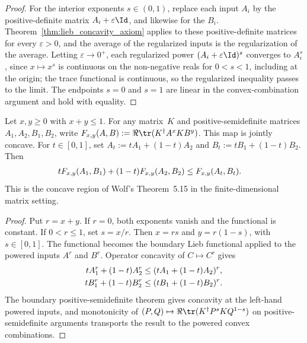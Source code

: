 \begin{proof}\leanok
    For the interior exponents $s\in(0,1)$, replace each input $A_i$ by the
    positive-definite matrix $A_i+\varepsilon\Id$, and likewise for the $B_i$.
    Theorem~\ref{thm:lieb_concavity_axiom} applies to these positive-definite
    matrices for every $\varepsilon>0$, and the average of the regularized
    inputs is the regularization of the average. Letting $\varepsilon\to0^+$,
    each regularized power $(A_i+\varepsilon\Id)^s$ converges to $A_i^s$, since
    $x\mapsto x^s$ is continuous on the non-negative reals for $0<s<1$, including
    at the origin; the trace functional is continuous, so the regularized
    inequality passes to the limit. The endpoints $s=0$ and $s=1$ are linear in
    the convex-combination argument and hold with equality.
\end{proof}

\begin{theorem}
    \label{thm:lieb_concavity_subboundary}
    \leanok
    Let $x,y\ge0$ with $x+y\le1$. For any matrix~$K$ and
    positive-semidefinite matrices $A_1,A_2,B_1,B_2$, write
    $F_{x,y}(A,B):=\Re\tr(K^\dagger A^x K B^y)$. This map is jointly concave.
    For $t\in[0,1]$, set $A_t:=tA_1+(1-t)A_2$ and
    $B_t:=tB_1+(1-t)B_2$. Then
    \begin{align}
        tF_{x,y}(A_1,B_1)+(1-t)F_{x,y}(A_2,B_2)
        &\le F_{x,y}(A_t,B_t).
        \notag
    \end{align}
    This is the concave region of Wolf's Theorem~5.15 in the
    finite-dimensional matrix setting.
\end{theorem}

\begin{proof}\leanok
    Put $r=x+y$. If $r=0$, both exponents vanish and the functional is constant.
    If $0<r\le1$, set $s=x/r$. Then $x=rs$ and $y=r(1-s)$, with
    $s\in[0,1]$. The functional becomes the boundary Lieb functional applied to
    the powered inputs $A^r$ and $B^r$. Operator concavity of
    $C\mapsto C^r$ gives
    \begin{align}
        tA_1^r+(1-t)A_2^r
        &\le (tA_1+(1-t)A_2)^r,
        \notag\\
        tB_1^r+(1-t)B_2^r
        &\le (tB_1+(1-t)B_2)^r.
        \notag
    \end{align}
    The boundary positive-semidefinite theorem gives concavity at the left-hand
    powered inputs, and monotonicity of
    $(P,Q)\mapsto\Re\tr(K^\dagger P^s K Q^{1-s})$ on positive-semidefinite
    arguments transports the result to the powered convex combinations.
\end{proof}

